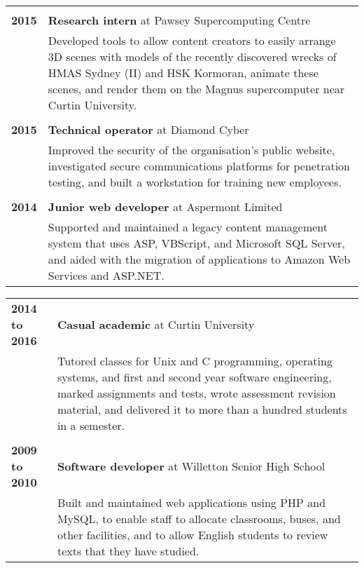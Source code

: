 \documentclass[a4paper,12pt]{article}
\begin{document}
\begin{tabular}{p{35mm}p{125mm}}
	\\              \\  \textbf{2015}               & \textbf{Research intern} at Pawsey Supercomputing Centre
	\vspace{0.2em}  \\                              & Developed tools to allow content creators to easily arrange 3D scenes with models of the recently discovered wrecks of HMAS Sydney (II) and HSK Kormoran, animate these scenes, and render them on the Magnus supercomputer near Curtin University.
	\\              \\  \textbf{2015}               & \textbf{Technical operator} at Diamond Cyber
	\vspace{0.2em}  \\                              & Improved the security of the organisation's public website, investigated secure communications platforms for penetration testing, and built a workstation for training new employees.
	\\              \\  \textbf{2014}               & \textbf{Junior web developer} at Aspermont Limited
	\vspace{0.2em}  \\                              & Supported and maintained a legacy content management system that uses ASP, VBScript, and Microsoft SQL Server, and aided with the migration of applications to Amazon Web Services and ASP.NET.
\end{tabular}

\begin{tabular}{p{35mm}p{125mm}}
	                    \textbf{2014 to 2016}       & \textbf{Casual academic} at Curtin University
	\vspace{0.2em}  \\                              & Tutored classes for Unix and C programming, operating systems, and first and second year software engineering, marked assignments and tests, wrote assessment revision material, and delivered it to more than a hundred students in a semester.
	\\              \\  \textbf{2009 to 2010}       & \textbf{Software developer} at Willetton Senior High School
	\vspace{0.2em}  \\                              & Built and maintained web applications using PHP and MySQL, to enable staff to allocate classrooms, buses, and other facilities, and to allow English students to review texts that they have studied.
\end{tabular}
\end{document}
